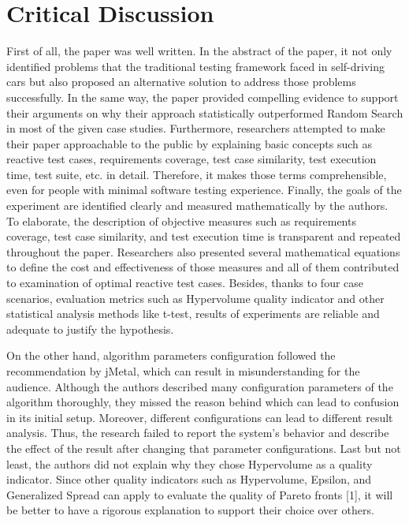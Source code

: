 \documentclass[10pt,a4paper]{report}
\begin{document}
\section{Critical Discussion}
First of all, the paper was well written. In the abstract of the paper, it not only identified problems that the traditional testing framework faced in self-driving cars but also proposed an alternative solution to address those problems successfully. In the same way, the paper provided compelling evidence to support their arguments on why their approach statistically outperformed Random Search in most of the given case studies. Furthermore, researchers attempted to make their paper approachable to the public by explaining basic concepts such as reactive test cases, requirements coverage, test case similarity, test execution time, test suite, etc. in detail. Therefore, it makes those terms comprehensible, even for people with minimal software testing experience. Finally, the goals of the experiment are identified clearly and measured mathematically by the authors. To elaborate, the description of objective measures such as requirements coverage, test case similarity, and test execution time is transparent and repeated throughout the paper. Researchers also presented several mathematical equations to define the cost and effectiveness of those measures and all of them contributed to examination of optimal reactive test cases. Besides, thanks to four case scenarios, evaluation metrics such as Hypervolume quality indicator and other statistical analysis methods like t-test, results of experiments are reliable and adequate to justify the hypothesis.

On the other hand, algorithm parameters conﬁguration followed the recommendation by jMetal, which can result in misunderstanding for the audience. Although the authors described many conﬁguration parameters of the algorithm thoroughly, they missed the reason behind which can lead to confusion in its initial setup. Moreover, diﬀerent configurations can lead to diﬀerent result analysis. Thus, the research failed to report the system’s behavior and describe the eﬀect of the result after changing that parameter conﬁgurations. Last but not least, the authors did not explain why they chose Hypervolume as a quality indicator. Since other quality indicators such as Hypervolume, Epsilon, and Generalized Spread can apply to evaluate the quality of Pareto fronts [1], it will be better to have a rigorous explanation to support their choice over others.
\newpage 
\end{document}

